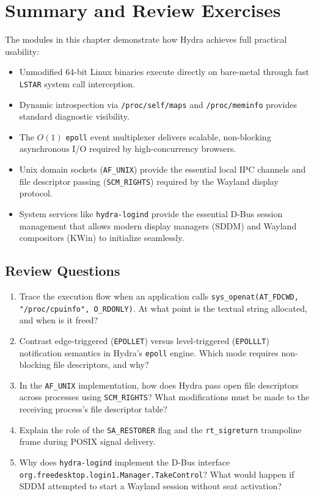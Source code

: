\section{Summary and Review Exercises}
\label{sec:linux_source_exercises}

The modules in this chapter demonstrate how Hydra achieves full practical usability:
\begin{itemize}
    \item Unmodified 64-bit Linux binaries execute directly on bare-metal through fast \texttt{LSTAR} system call interception.
    \item Dynamic introspection via \texttt{/proc/self/maps} and \texttt{/proc/meminfo} provides standard diagnostic visibility.
    \item The $O(1)$ \texttt{epoll} event multiplexer delivers scalable, non-blocking asynchronous I/O required by high-concurrency browsers.
    \item Unix domain sockets (\texttt{AF\_UNIX}) provide the essential local IPC channels and file descriptor passing (\texttt{SCM\_RIGHTS}) required by the Wayland display protocol.
    \item System services like \texttt{hydra-logind} provide the essential D-Bus session management that allows modern display managers (SDDM) and Wayland compositors (KWin) to initialize seamlessly.
\end{itemize}

\subsection*{Review Questions}
\begin{enumerate}
    \item Trace the execution flow when an application calls \texttt{sys\_openat(AT\_FDCWD, "/proc/cpuinfo", O\_RDONLY)}. At what point is the textual string allocated, and when is it freed?
    \item Contrast edge-triggered (\texttt{EPOLLET}) versus level-triggered (\texttt{EPOLLLT}) notification semantics in Hydra's \texttt{epoll} engine. Which mode requires non-blocking file descriptors, and why?
    \item In the \texttt{AF\_UNIX} implementation, how does Hydra pass open file descriptors across processes using \texttt{SCM\_RIGHTS}? What modifications must be made to the receiving process's file descriptor table?
    \item Explain the role of the \texttt{SA\_RESTORER} flag and the \texttt{rt\_sigreturn} trampoline frame during POSIX signal delivery.
    \item Why does \texttt{hydra-logind} implement the D-Bus interface \texttt{org.freedesktop.login1.Manager.TakeControl}? What would happen if SDDM attempted to start a Wayland session without seat activation?
\end{enumerate}

